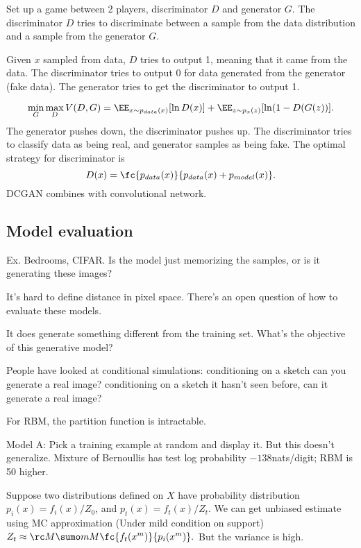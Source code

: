 Set up a game between 2 players, discriminator $D$ and generator $G$. The discriminator $D$ tries to discriminate between a sample from the data distribution and a sample from the generator $G$. 

Given $x$ sampled from data, $D$ tries to output 1, meaning that it came from the data. %
The discriminator tries to output 0 for data generated from the generator (fake data). The generator tries to get the discriminator to output 1.

$$
\min_G\max_D V(D,G) = \EE_{x\sim p_{data}(x)} [\ln D(x)] + \EE_{z\sim p_x(z)} [\ln (1-D(G(z))].
$$
The generator pushes down, the discriminator pushes up. The discriminator tries to classify data as being real, and generator samples as being fake. The optimal strategy for discriminator is
$$
D(x) = \fc{p_{data}(x)}{p_{data}(x) + p_{model}(x)}.
$$
DCGAN combines with convolutional network.
\subsection{Model evaluation}
Ex. Bedrooms, CIFAR. Is the model just memorizing the samples, or is it generating these images? 

It's hard to define distance in pixel space. There's an open question of how to evaluate these models.

It does generate something different from the training set.
What's the objective of this generative model?

People have looked at conditional simulations: conditioning on a sketch can you generate a real image? conditioning on a sketch it hasn't seen before, can it generate a real image?

For RBM, the partition function is intractable.

Model A: Pick a training example at random and display it. But this doesn't generalize. 
Mixture of Bernoullis has test log probability $-138$nats/digit; RBM is 50 higher.

Suppose two distributions defined on $X$ have probability distribution $p_i(x) = f_i(x)/Z_0$, and $p_t(x) = f_t(x) /Z_t$.
We can get unbiased estimate using MC approximation (Under mild condition on support)
$Z_t\approx \rc M\sumo mM\fc{f_t(x^m)}{p_i(x^m)}.$
But the variance is high.


